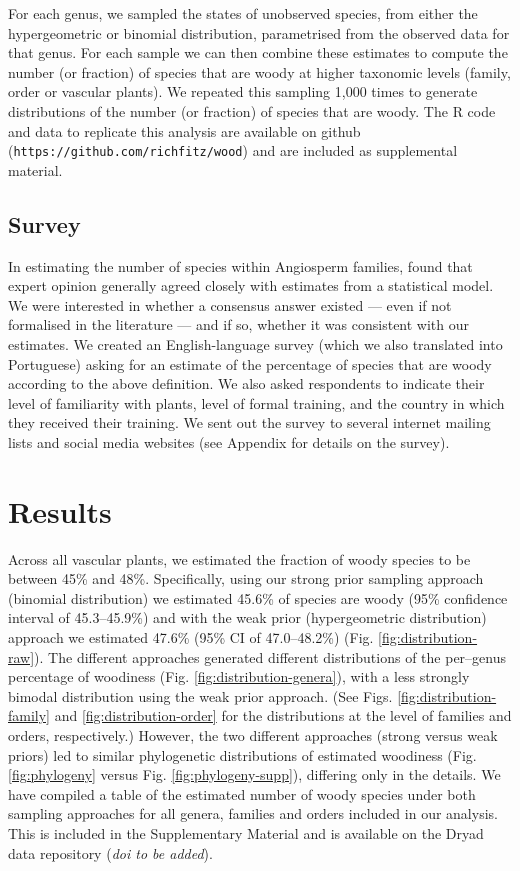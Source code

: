 \documentclass[a4paper,12pt]{article}
\begin{document}
For each genus, we sampled the states of unobserved species, from
either the hypergeometric or binomial distribution, parametrised from
the observed data for that genus.
%
For each sample we can then combine these estimates to compute the
number (or fraction) of species that are woody at higher taxonomic
levels (family, order or vascular plants).  We repeated this sampling
1,000 times to generate distributions of the number (or fraction) of
species that are woody.
%
The R code and data to replicate this analysis are available on github
(\texttt{https://github.com/richfitz/wood}) and are included
as supplemental material.

\subsection{Survey}

In estimating the number of species within Angiosperm families,
\citet{joppa2010} found that expert opinion generally agreed closely
with estimates from a statistical model.  We were interested in
whether a consensus answer existed --- even if not formalised in the
literature --- and if so, whether it was consistent with our
estimates.
% 
We created an English-language survey (which we also translated into
Portuguese) asking for an estimate of the percentage of species that
are woody according to the above definition.  We also asked
respondents to indicate their level of familiarity with plants, level
of formal training, and the country in which they received their
training. We sent out the survey to several internet mailing lists and
social media websites (see Appendix for details on the
survey).

\section{Results}

Across all vascular plants, we estimated the fraction of woody species
to be between 45\% and 48\%.
Specifically, using our strong prior sampling approach (binomial
distribution) we estimated 45.6\% of species are woody (95\%
confidence interval of 45.3--45.9\%) and with the weak prior
(hypergeometric distribution) approach we estimated 47.6\% (95\% CI of
47.0--48.2\%) (Fig. \ref{fig:distribution-raw}).
%
The different approaches generated different distributions of the
per--genus percentage of woodiness (Fig.
\ref{fig:distribution-genera}), with a less strongly bimodal
distribution using the weak prior approach. (See Figs.
\ref{fig:distribution-family} and \ref{fig:distribution-order} 
for the distributions at the level of families and orders, respectively.) 
However, the two different approaches (strong
versus weak priors) led to similar phylogenetic distributions of
estimated woodiness (Fig. \ref{fig:phylogeny} versus Fig.
\ref{fig:phylogeny-supp}), differing only in the details. We have compiled
a table of the estimated number of woody species under both sampling
approaches for all genera, families and orders included in our analysis.
This is included in the Supplementary Material and is available on the 
Dryad data repository (\textit{doi to be added}).
\end{document}
